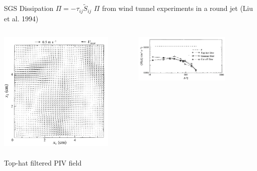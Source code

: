 \begin{frame}{SGS Dissipation $\Pi = -\tau_{ij}\widetilde{S}_{ij}$}
$\Pi$ from wind tunnel experiments in a round jet (Liu et al. 1994)    \begin{columns}
    \begin{column}{.5\textwidth}
    \begin{minipage}[c][.8\textheight][c]{\linewidth}
    \includegraphics[width=\textwidth]{apriori6}
    ~\\\tiny{Top-hat filtered PIV field}
      \end{minipage}
    \end{column}
    \begin{column}{.5\textwidth}
      \begin{figure}
      \includegraphics[width=0.9\textwidth]{apriori7}

\end{figure}
\end{column}
\end{columns}
\end{frame}
